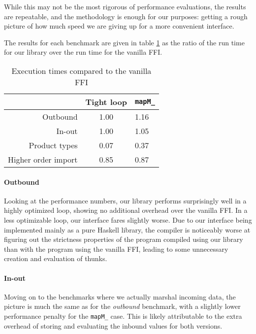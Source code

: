 \documentclass[preprint]{sigplanconf}
\begin{document}
While this may not be the most rigorous of performance evaluations,
the results are repeatable, and the methodology is enough for our purposes:
getting a rough picture of how much speed we are giving up for a more
convenient interface.

The results for each benchmark are given in table \ref{tbl:performance} as
the ratio of the run time for our library over the run time for the vanilla
FFI.

\begin{table}
  \renewcommand{\arraystretch}{1.5}
  \begin{center}
    \begin{tabular}{|r|c|l|}
      \hline
                                   & Tight loop & \lstinline!mapM_! \\
      \hline
      Outbound                     & 1.00       & 1.16 \\
      \hline
      In-out                       & 1.00       & 1.05 \\
      \hline
      Product types                & 0.07       & 0.37 \\
      \hline
      Higher order import          & 0.85       & 0.87 \\
      \hline
    \end{tabular}
  \end{center}
  \caption{Execution times compared to the vanilla FFI}
  \label{tbl:performance}
\end{table}

\paragraph{Outbound}
Looking at the performance numbers, our library performs surprisingly well in
a highly optimized loop, showing no additional overhead over the vanilla FFI.
In a less optimizable loop, our interface fares slightly worse.
Due to our interface being
implemented mainly as a pure Haskell library, the compiler is noticeably worse
at figuring out the strictness properties of the program compiled using our
library than with the program using the vanilla FFI, leading to some
unnecessary creation and evaluation of thunks.

\paragraph{In-out}
Moving on to the benchmarks where we actually marshal incoming data, the
picture is much the same as for the \emph{outbound} benchmark, with a slightly
lower performance penalty for the \lstinline!mapM_! case. This is likely
attributable to the extra overhead of storing and evaluating the inbound
values for both versions.
\end{document}
